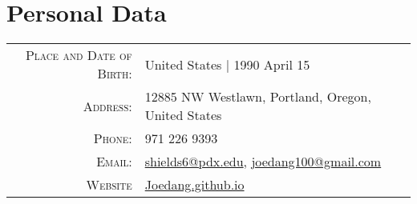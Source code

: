 \documentclass[letterpaper]{article}
\begin{document}
\par{\bigskip\par} %


\section{Personal Data}
\begin{center}
\begin{tabular}{rl}
\textsc{Place and Date of Birth:} & United States  | 1990 April 15 \\
\textsc{Address:} & 12885 NW Westlawn, Portland, Oregon, United States \\
\textsc{Phone:} & 971 226 9393\\
\textsc{Email:} & \href{mailto:shields6@pdx.edu}{shields6@pdx.edu}, \href{mailto:joedang100@gmail.com}{joedang100@gmail.com}\\
\textsc{Website} & \href{Joedang.github.io}{Joedang.github.io}
\end{tabular}
\end{center}

\end{document}
